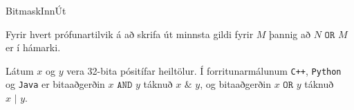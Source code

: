 \begin{problem}{Bitmask}{Inn}{Út}{~}{~}
	\Output

		Fyrir hvert prófunartilvik á að skrifa út minnsta gildi fyrir $M$ þannig að $N \texttt{ OR } M$ er í hámarki.

	\Examples

		\begin{example}
		\end{example}

	\Note

		Látum $x$ og $y$ vera 32-bita pósitífar heiltölur. Í forritunarmálunum \texttt{C++}, \texttt{Python} og \texttt{Java} er bitaaðgerðin $x \texttt{ AND } y$ táknuð $x \texttt{ \&{} } y$, og bitaaðgerðin $x \texttt{ OR } y$ táknuð $x \texttt{ | } y$.


\end{problem}